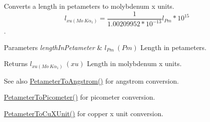 Converts a length in petameters to molybdenum x units. \[ l_{xu(Mo\ K\alpha_1)}=\frac{1}{1.00209952*10^{-13}} l_{Pm} * 10^{15}\]. 


\begin{DoxyParams}{Parameters}
{\em length\+In\+Petameter} & $ l_{Pm}\ (Pm)$ Length in petameters. \\
\hline
\end{DoxyParams}
\begin{DoxyReturn}{Returns}
$ l_{xu(Mo\ K\alpha_1)}\ (xu)$ Length in molybdenum x units. 
\end{DoxyReturn}
\begin{DoxySeeAlso}{See also}
\mbox{\hyperlink{group___e_g_x_math-_conversions-_length_conversions-_s_i-_petameter-_non-_s_i_ga2acc301b8b78a80d23a150da8cba3814}{Petameter\+To\+Angstrom()}} for angstrom conversion. 

\mbox{\hyperlink{group___e_g_x_math-_conversions-_length_conversions-_s_i-_petameter-_s_i_ga092df775702bdd1b027e20a243d0aa75}{Petameter\+To\+Picometer()}} for picometer conversion. 

\mbox{\hyperlink{group___e_g_x_math-_conversions-_length_conversions-_s_i-_petameter-_non-_s_i_gad9b37964189c5963e4c634122fd763fe}{Petameter\+To\+Cu\+X\+Unit()}} for copper x unit conversion. 
\end{DoxySeeAlso}
